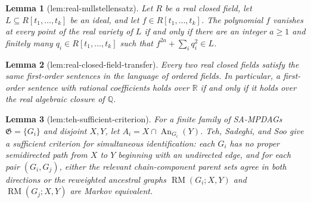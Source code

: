 \documentclass{article}
\newtheorem{lemma}{Lemma}
\begin{document}
\begin{lemma}[lem:real-nullstellensatz]\label{lem:real-nullstellensatz}
Let \(R\) be a real closed field, let \(L\subseteq R[t_1,\ldots,t_k]\) be an ideal, and let \(f\in R[t_1,\ldots,t_k]\).  The polynomial \(f\) vanishes at every point of the real variety of \(L\) if and only if there are an integer \(a\geq1\) and finitely many \(q_i\in R[t_1,\ldots,t_k]\) such that \(f^{2a}+\sum_iq_i^2\in L\).
\end{lemma}

\begin{lemma}[lem:real-closed-field-transfer]\label{lem:real-closed-field-transfer}
Every two real closed fields satisfy the same first-order sentences in the language of ordered fields.  In particular, a first-order sentence with rational coefficients holds over \(\mathbb R\) if and only if it holds over the real algebraic closure of \(\mathbb Q\).
\end{lemma}

\begin{lemma}[lem:teh-sufficient-criterion]\label{lem:teh-sufficient-criterion}
For a finite family of SA-MPDAGs \(\mathfrak G=\{G_i\}\) and disjoint \(X,Y\), let \(A_i=X\cap\operatorname{An}_{G_i}(Y)\).  Teh, Sadeghi, and Soo give a sufficient criterion for simultaneous identification: each \(G_i\) has no proper semidirected path from \(X\) to \(Y\) beginning with an undirected edge, and for each pair \((G_i,G_j)\), either the relevant chain-component parent sets agree in both directions or the reweighted ancestral graphs \(\operatorname{RM}(G_i;X,Y)\) and \(\operatorname{RM}(G_j;X,Y)\) are Markov equivalent.
\end{lemma}
\end{document}
